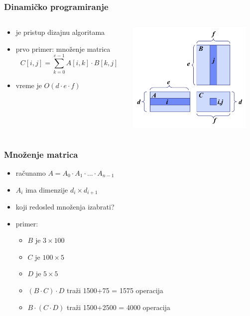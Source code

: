 \documentclass[compress]{beamer}
\begin{document}
\begin{frame}[fragile]
  \frametitle{Dinamičko programiranje}
  \begin{columns}
    \begin{column}[t]{6cm}
      \begin{itemize}
        \item {} je pristup dizajnu algoritama
        \item prvo primer: množenje matrica
        $$ C[i,j] = \sum_{k=0}^{e-1} A[i,k]\cdot B[k,j]$$
        \item vreme je $O(d\cdot e\cdot f)$
      \end{itemize}
    \end{column}
    \begin{column}[t]{6cm}
      \begin{center}
        \includegraphics[width=6cm]{asp-13-pic08.png}
      \end{center}
    \end{column}
  \end{columns}
\end{frame}

\begin{frame}[fragile]
  \frametitle{Množenje matrica}
  \begin{itemize}
    \item računamo $A=A_0 \cdot A_{1}\cdot \ldots\cdot A_{n-1}$
    \item $A_{i}$ ima dimenzije $d_{i}\times d_{i+1}$
    \item koji redosled množenja izabrati?
    \item primer:
    \begin{itemize}
      \item $B$ je $3\times 100$
      \item $C$ je $100\times 5$
      \item $D$ je $5\times 5$
      \item $(B\cdot C)\cdot D$ traži 1500+75 = 1575 operacija
      \item $B\cdot (C\cdot D)$ traži 1500+2500 = 4000 operacija
    \end{itemize}
  \end{itemize}
\end{frame}
\end{document}
